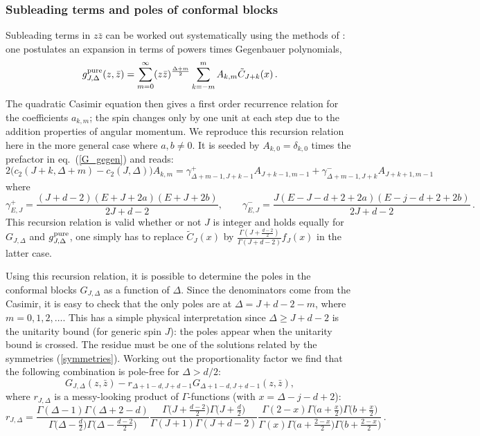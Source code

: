 \documentclass[11pt, reqno,preprint]{article}
\def\be{\begin{equation}}
\def\ee{\end{equation}}
\def\gpure{g^{\rm pure}}
\def\zbar{\bar{z}}
\def\j{J}
\begin{document}
\begin{appendix}
\subsubsection*{Subleading terms and poles of conformal blocks}

Subleading terms in $z\zbar$ can be worked out systematically using the methods of \cite{Hogervorst:2013sma}:
one postulates an expansion in terms of powers times Gegenbauer polynomials,
\be
 \gpure_{\j,\Delta}(z,\zbar) = \sum_{m=0}^\infty (z\zbar)^{\frac{\Delta+m}{2}}
 \sum_{k=-m}^m A_{k,m}
  \tilde{C}_{\j+k}(x)\,. \label{origin_expansion}
\ee
The quadratic Casimir equation
then gives a first order recurrence relation
for the coefficients $a_{k,m}$;
the spin changes only by one unit at each step
due to the addition properties of angular momentum.
We reproduce this recursion relation here in the more general
case where $a,b\neq 0$. It is seeded by $A_{k,0}=\delta_{k,0}$ times the prefactor in eq.~(\ref{G_gegen})
and reads:
\be
2\big(c_2(\j+k,\Delta+m)-c_2(\j,\Delta)\big) A_{k,m} =
\gamma^+_{\Delta+m-1,\j+k-1}A_{\j+k-1,m-1}+\gamma^-_{\Delta+m-1,\j+k}A_{\j+k+1,m-1}
\ee
where
\be
 \gamma^+_{E,\j} = \frac{(\j{+}d{-}2)(E{+}\j{+}2a)(E{+}\j{+}2b)}{2\j{+}d{-}2},\qquad
 \gamma^-_{E,\j} = \frac{\j(E{-}\j{-}d{+}2{+}2a)(E{-}j{-}d{+}2{+}2b)}{2\j{+}d{-}2}\,.
\ee
This recursion relation is valid whether or not $\j$ is integer
and holds equally for $G_{\j,\Delta}$ and $\gpure_{\j,\Delta}$,
one simply has to replace
$\tilde{C}_\j(x)$ by $\frac{\Gamma(\j+\frac{d-2}{2})}{\Gamma(\j+d-2)}f_\j(x)$ in the latter case.

Using this recursion relation, it is possible to determine the poles in the conformal blocks $G_{\j,\Delta}$
as a function of $\Delta$. %
Since the denominators come from the Casimir, it is easy to check that the only poles are at $\Delta=\j+d-2-m$,
where $m=0,1,2,\ldots$. This has a simple physical interpretation since $\Delta\geq\j+d-2$ is the unitarity bound
(for generic spin $\j$): the poles appear when the unitarity bound is crossed.
The residue must be one of the solutions related by the symmetries (\ref{symmetries}).
Working out the proportionality factor we find that the following combination is pole-free for $\Delta>d/2$:
\be
 G_{\j,\Delta}(z,\zbar) - r_{\Delta+1-d,\j+d-1} G_{\Delta+1-d,\j+d-1}(z,\zbar),
\ee
where $r_{\j,\Delta}$ is a messy-looking product of $\Gamma$-functions (with
$x=\Delta-j-d+2$):
\be
\label{r}
r_{\j,\Delta} = \frac
 {\Gamma(\Delta-1)\Gamma(\Delta+2-d)}{\Gamma\big(\Delta-\tfrac{d}{2}\big)\Gamma\big(\Delta-\tfrac{d-2}{2}\big)}
 \frac{\Gamma\big(\j+\tfrac{d-2}{2}\big)\Gamma\big(\j+\tfrac{d}{2}\big)}{\Gamma(\j+1)\Gamma(\j+d-2)}
 \frac{\Gamma(2-x)\Gamma\big(a+\tfrac{x}{2}\big)\Gamma\big(b+\tfrac{x}{2}\big)}
 {\Gamma(x)\Gamma\big(a+\tfrac{2-x}{2}\big)\Gamma\big(b+\tfrac{2-x}{2}\big)}\,.
\ee



\end{appendix}
\end{document}
